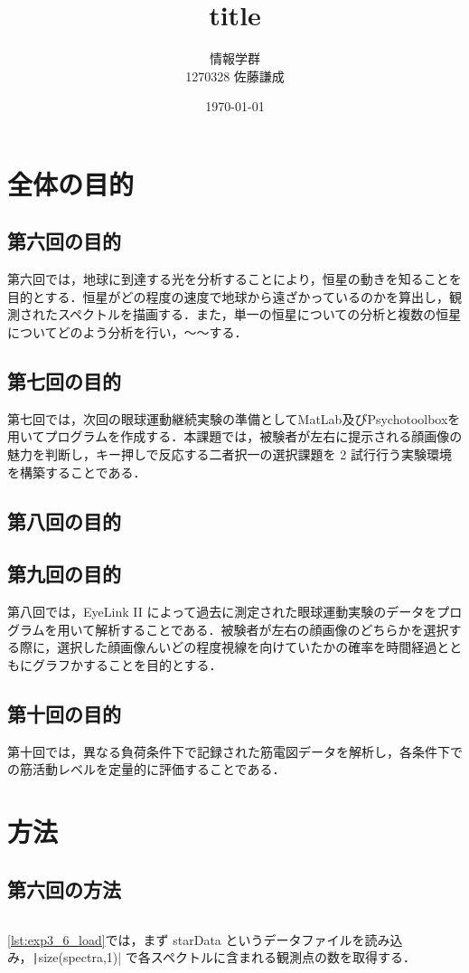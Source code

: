 \documentclass[dvipdfmx, titlepage, t]{jsarticle}
\title{title}
\author{情報学群 \\ 1270328 佐藤謙成}
\date{\today}
\begin{document}
\maketitle

\begin{abstract}
    
\end{abstract}
\section{全体の目的}
\subsection{第六回の目的}
    第六回では，地球に到達する光を分析することにより，恒星の動きを知ることを目的とする．恒星がどの程度の速度で地球から遠ざかっているのかを算出し，観測されたスペクトルを描画する．また，単一の恒星についての分析と複数の恒星についてどのよう分析を行い，～～する．
\subsection{第七回の目的}
    第七回では，次回の眼球運動継続実験の準備としてMatLab及びPsychotoolboxを用いてプログラムを作成する．本課題では，被験者が左右に提示される顔画像の魅力を判断し，キー押しで反応する二者択一の選択課題を 2 試行行う実験環境を構築することである．
\subsection{第八回の目的}
\subsection{第九回の目的}
    第八回では，EyeLink II によって過去に測定された眼球運動実験のデータをプログラムを用いて解析することである．被験者が左右の顔画像のどちらかを選択する際に，選択した顔画像んいどの程度視線を向けていたかの確率を時間経過とともにグラフかすることを目的とする．
\subsection{第十回の目的}
第十回では，異なる負荷条件下で記録された筋電図データを解析し，各条件下での筋活動レベルを定量的に評価することである．

\section{方法}
\subsection{第六回の方法}
    \inputminted[linenos, firstline=1, lastline=2, frame=lines, fontsize=\small]{matlab}{code/Exp3_6_Matlab.m}
    \ref{lst:exp3_6_load}では，まず starData というデータファイルを読み込み，\texttt|size(spectra,1)| で各スペクトルに含まれる観測点の数を取得する．
\end{document}
